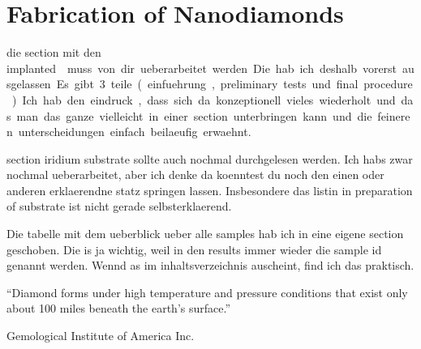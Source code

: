 
\chapter{Fabrication of Nanodiamonds}	\label{ch::fabrication_nanodiamonds}

	\begin{remark}
			\item die section mit den \si implanted \nds muss von dir ueberarbeitet werden. Die hab ich deshalb vorerst ausgelassen. Es gibt 3 teile (einfuehrung, preliminary tests und final procedure). Ich hab den eindruck, dass sich da konzeptionell vieles wiederholt und das man das ganze vielleicht in einer section unterbringen kann und die feineren unterscheidungen einfach beilaeufig erwaehnt.
			\item section iridium substrate sollte auch nochmal durchgelesen werden. Ich habs zwar nochmal ueberarbeitet, aber ich denke da koenntest du noch den einen oder anderen erklaerendne statz springen lassen. Insbesondere das listin in preparation of substrate ist nicht gerade selbsterklaerend.
			\item Die tabelle mit dem ueberblick ueber alle samples hab ich in eine eigene section geschoben. Die is ja wichtig, weil in den results immer wieder die sample id genannt werden. Wennd as im inhaltsverzeichnis auscheint, find ich das praktisch.
	\end{remark}

	\epigraph{``Diamond forms under high temperature and pressure conditions that exist only about 100 miles beneath the earth's surface.''}{\textup{Gemological Institute of America Inc.}}

